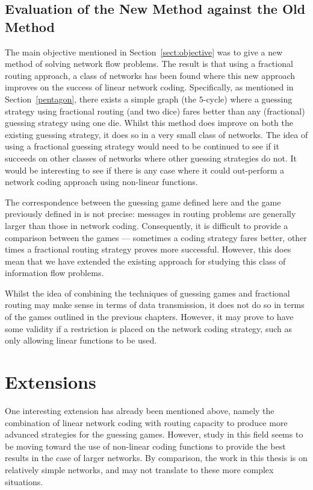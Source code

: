 \subsection{Evaluation of the New Method against the Old Method}

The main objective mentioned in Section~\ref{sect:objective} was to give a new method of solving network flow problems. The result is that using a fractional routing approach, a class of networks has been found where this new approach improves on the success of linear network coding. Specifically, as mentioned in Section~\ref{pentagon}, there exists a simple graph (the $5$-cycle) where a guessing strategy using fractional routing (and two dice) fares better than any (fractional) guessing strategy using one die. Whilst this method does improve on both the existing guessing strategy, it does so in a very small class of networks. The idea of using a fractional guessing strategy would need to be continued to see if it succeeds on other classes of networks where other guessing strategies do not. It would be interesting to see if there is any case where it could out-perform a network coding approach using non-linear functions.

The correspondence between the guessing game defined here and the game previously defined in \cite{riis2005util} is not precise: messages in routing problems are generally larger than those in network coding. Consequently, it is difficult to provide a comparison between the games --- sometimes a coding strategy fares better, other times a fractional routing strategy proves more successful. However, this does mean that we have extended the existing approach for studying this class of information flow problems.

Whilst the idea of combining the techniques of guessing games and fractional routing may make sense in terms of data transmission, it does not do so in terms of the games outlined in the previous chapters. However, it may prove to have some validity if a restriction is placed on the network coding strategy, such as only allowing linear functions to be used.

\newpage

\section{Extensions}

One interesting extension has already been mentioned above, namely the combination of linear network coding with routing capacity to produce more advanced strategies for the guessing games. However, study in this field seems to be moving toward the use of non-linear coding functions to provide the best results in the case of larger networks. By comparison, the work in this thesis is on relatively simple networks, and may not translate to these more complex situations.

